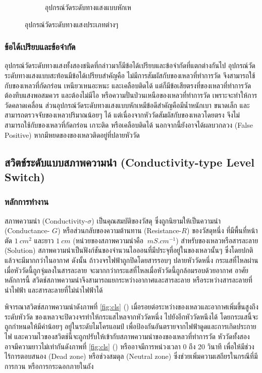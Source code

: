 \documentclass[final,11pt]{article}
\begin{document}
\begin{figure}
\begin{subfigure}[b]{0.35\textwidth}
        \caption{อุปกรณ์วัดระดับทางแสงแบบหักเห}
        \label{fig:ols2}
    \end{subfigure}
    \hfill
    \caption{อุปกรณ์วัดระดับทางแสงประเภทต่างๆ}
    \label{fig:ols}
\end{figure}


\subsubsection{ข้อได้เปรียบและข้อจำกัด}
อุปกรณ์วัดระดับทางแสงทั้งสองชนิดที่กล่าวมาก็มีข้อได้เปรียบและข้อจำกัดที่แตกต่างกันไป อุปกรณ์วัดระดับทางแสงแบบสะท้อนมีข้อได้เปรียบสำคัญคือ
ไม่มีการสัมผัสกับของเหลวที่ทำการวัด จึงสามารถใช้กับของเหลวที่กัดกร่อน เหนียวเหนอะหนะ และเคลือบติดได้ แต่ก็มีข้อเสียตรงที่ของเหลวที่ทำการวัดต้องทึบแสงพอสมควร
และต้องไม่มีไอ หรือความปั่นป่วนเหนือของเหลวที่ทำการวัด เพราะจะทำให้การวัดคลาดเคลื่อน ส่วนอุปกรณ์วัดระดับทางแสงแบบหักเหมีข้อดีสำคัญคือมีน้ำหนักเบา ขนาดเล็ก
และสามารถตรวจจับของเหลวปริมาณน้อยๆ ได้ แต่เนื่องจากหัววัดสัมผัสกับของเหลวโดยตรง จึงไม่สามารถใช้กับของเหลวที่กัดกร่อน เกาะติด หรือเคลือบติดได้ 
นอกจากนี้ยังอาจได้ผลบวกลวง (False Positive) หากมีหยดของของเหลวติดอยู่ที่ปลายหัววัด



\subsection{สวิตช์ระดับแบบสภาพความนำ (Conductivity-type Level Switch)}
\subsubsection{หลักการทำงาน}
สภาพความนำ (Conductivity-$\sigma$) เป็นคุณสมบัติของวัสดุ ซึ่งถูกนิยามให้เป็นความนำ (Conductance- $G$) 
หรือส่วนกลับของความต้านทาน (Resistance-$R$) ของวัสดุหนึ่ง ที่มีพื้นที่หน้าตัด $\SI{1}{cm^2}$ และยาว $\SI{1}{cm}$ 
(หน่วยของสภาพความนำคือ $\SI{}{mS.cm^{-1}}$) สำหรับของเหลวหรือสารละลาย (Solution) 
สภาพความนำเป็นฟังก์ชันของจำนวนไอออนที่มีประจุที่อยู่ในของเหลวนั้นๆ ซึ่งโดยปกติแล้วจะมีมากกว่าในอากาศ ดังนั้น 
ถ้าวงจรไฟฟ้าถูกปิดโดยสารรอบๆ ปลายหัววัดหนึ่ง กระแสที่ไหลผ่านเมื่อหัววัดนี้ถูกจุ่มลงในสารละลาย จะมากกว่ากระแสที่ไหลเมื่อหัววัดนี้ถูกล้อมรอบด้วยอากาศ
อาศัยหลักการนี้ สวิตช์สภาพความนำจึงสามารถแยกระหว่างอากาศและสารละลาย หรือระหว่างสารละลายที่นำไฟฟ้า และสารละลายที่ไม่นำไฟฟ้าได้ 

พิจารณาสวิตช์สภาพความนำดังภาพที่ \ref{fig:cls} () เมื่อรอยต่อระหว่างของเหลวและอากาศเพิ่มขึ้นสูงถึงระดับหัววัด ของเหลวจะปิดวงจรทำให้กระแสไหลจากหัววัดหนึ่ง
ไปยังอีกหัววัดหนึงได้ โดยกระแสนี้จะถูกกำหนดให้มีค่าน้อยๆ อยู่ในระดับไมโครแอมป์ เพื่อป้องกันอันตรายจากไฟฟ้าดูดและการเกิดประกายไฟ 
และความไวของสวิตช์นี้จะถูกปรับให้เข้ากับสภาพความนำของของเหลวที่ทำการวัด หัววัดทั้งสองอาจมีความยาวไม่เท่ากันดังภาพที่ \ref{fig:cls} () หรืออาจมีการหน่วงเวลา 0 ถึง 20 วินาที 
เพื่อให้มีช่วงไร้การตอบสนอง (Dead zone) หรือช่วงสมดุล (Neutral zone) ซึ่งช่วยเพิ่มความเสถียรในกรณีที่มีการกวน หรือการกระฉอกภายในถัง 
\end{document}
